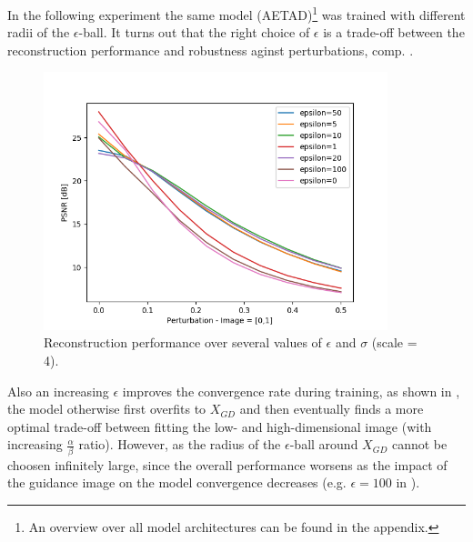 In the following experiment the same model (AETAD)\footnote{An overview over
all model architectures can be found in the appendix.} was trained with different
radii of the $\epsilon$-ball. It turns out that the right choice of $\epsilon$
is a trade-off between the reconstruction performance and robustness aginst
perturbations, comp. .

\begin{figure}[!htbp]
	\centering
	\includegraphics[width=10cm]{figures/epsball_perturbation}
	\caption{Reconstruction performance over several values of $\epsilon$
  and $\sigma$ (scale = 4).}
  \label{fig:epsball_perturbation}
\end{figure}

Also an increasing
$\epsilon$ improves the convergence rate during training, as shown in
, the model otherwise first overfits to $X_{GD}$
and then eventually finds a more optimal trade-off between fitting the
low- and high-dimensional image (with increasing $\frac{\alpha}{\beta}$ ratio).
However, as  the radius of the $\epsilon$-ball
around $X_{GD}$ cannot be choosen infinitely large, since the overall performance
worsens as the impact of the guidance image on the model convergence decreases
(e.g. $\epsilon = 100$ in ).

